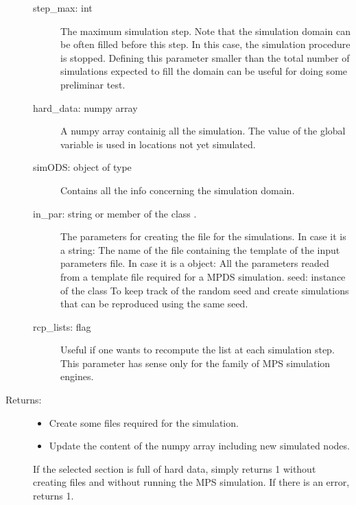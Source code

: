 \documentclass[letterpaper,10pt,english]{sphinxmanual}
\begin{document}
\begin{fulllineitems}
\begin{fulllineitems}
\begin{description}
\begin{description}
\item[{step\_max: int}] \leavevmode
The maximum simulation step. Note that the simulation
domain can be often filled before this step. In this
case, the simulation procedure is stopped.  Defining
this parameter smaller than the total number of
simulations expected to fill the domain can be useful
for doing some preliminar test.

\item[{hard\_data: numpy array}] \leavevmode
A numpy array containig all the simulation. The value
of the global variable  is used in
locations not yet simulated.

\item[{simODS: object of type }] \leavevmode
Contains all the info concerning the simulation
domain.

\item[{in\_par: string or member of the class .}] \leavevmode
The parameters for creating the  file for the
simulations.  In case it is a string: The name of the
file containing the template of the input parameters
file.  In case it is a  object:
All the parameters readed from a template  file
required for a MPDS simulation.  seed: instance of the
class  To keep track of the
random seed and create simulations that can be
reproduced using the same seed.

\item[{rcp\_lists: flag}] \leavevmode
Useful if one wants to re\sphinxhyphen{}compute the list at each 
simulation step. This parameter has sense only for the
 family of MPS simulation engines.

\end{description}

\item[{Returns:}] \leavevmode\begin{itemize}
\item {} 
Create some files required for the simulation.

\item {} 
Update the content of the numpy array 
including new simulated nodes.

\end{itemize}

If the selected section is full of hard data, simply
returns 1 without creating files and without running the
MPS simulation.  If there is an error, returns \sphinxhyphen{}1.

\end{description}

\end{fulllineitems}


\end{fulllineitems}
\end{document}
